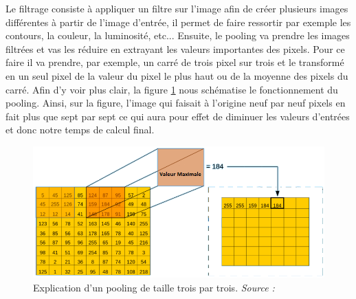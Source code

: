 Le filtrage consiste à appliquer un filtre sur l'image afin de créer plusieurs images différentes à partir de l'image d'entrée, il permet de faire ressortir par exemple les contours, la couleur, la luminosité, etc... Ensuite, le pooling va prendre les images filtrées et vas les réduire en extrayant les valeurs importantes des pixels. Pour ce faire il va prendre, par exemple, un carré de trois pixel sur trois et le transformé en un seul pixel de la valeur du pixel le plus haut ou de la moyenne des pixels du carré. Afin d'y voir plus clair, la figure \ref{CNNpooling} nous schématise le fonctionnement du pooling. Ainsi, sur la figure, l'image qui faisait à l'origine neuf par neuf pixels en fait plus que sept par sept ce qui aura pour effet de diminuer les valeurs d'entrées et donc notre temps de calcul final.

\begin{figure}[h]
    \includegraphics[scale=0.5]{src_img/CNNpooling.png}
    \caption{Explication d'un pooling de taille trois par trois. \textit{Source : \cite{CnnExplainArticle}}}
    \label{CNNpooling}
\end{figure}

